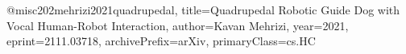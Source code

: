@misc{202mehrizi2021quadrupedal,
title={Quadrupedal Robotic Guide Dog with Vocal Human-Robot Interaction}, 
author={Kavan Mehrizi},
year={2021},
eprint={2111.03718},
archivePrefix={arXiv},
primaryClass={cs.HC}
}